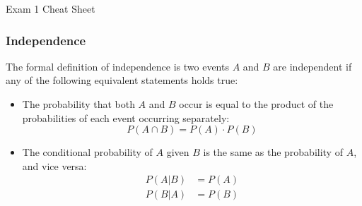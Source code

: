 \begin{cheatsheet}{Exam 1 Cheat Sheet}
    \subsubsection*{Independence}
    The formal definition of independence is two events $A$ and $B$ are independent if any of the following equivalent statements holds true:
    \begin{itemize}
        \item The probability that both $A$ and $B$ occur is equal to the product of the probabilities of each event occurring separately:
        \begin{equation*}
            P(A \cap B) = P(A) \cdot P(B)
        \end{equation*}
        \item The conditional probability of $A$ given $B$ is the same as the probability of $A$, and vice versa:
        \begin{align*}
            P(A|B) & = P(A) \\
            P(B|A) & = P(B)
        \end{align*}
    \end{itemize}
\end{cheatsheet}

